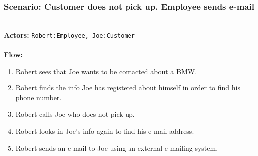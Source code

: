 \subsubsection{Scenario: Customer does not pick up. Employee sends e-mail}
\HRule \\[0.4cm]
\textbf{Actors:} \texttt{Robert:Employee, Joe:Customer}\\
\HRule \\[0.4cm]
\textbf{Flow:} \\
\begin{enumerate}
\item Robert sees that Joe wants to be contacted about a BMW.
\item Robert finds the info Joe has registered about himself in order to find his phone number.
\item Robert calls Joe who does not pick up.
\item Robert looks in Joe's info again to find his e-mail address.
\item Robert sends an e-mail to Joe using an external e-mailing system.
\end{enumerate}
\HRule \\[0.4cm]